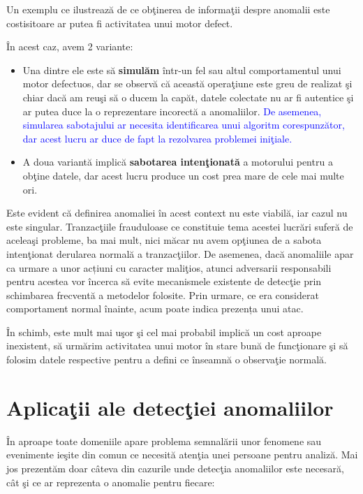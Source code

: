Un exemplu ce ilustrează de ce obţinerea de informaţii
despre anomalii este costisitoare ar putea fi activitatea unui
motor defect.

În acest caz, avem 2 variante:
\begin{itemize}
    \item Una dintre ele 
        este să \textbf{simulăm} 
        într-un fel sau altul comportamentul unui motor defectuos, dar 
        se observă că această operaţiune este greu de realizat şi chiar dacă am reuşi 
        să o ducem la capăt, datele colectate nu ar fi autentice şi ar putea duce 
        la o reprezentare incorectă a anomaliilor. \textcolor{blue}{
        De asemenea, simularea
        sabotajului ar necesita identificarea unui algoritm corespunzător, 
        dar acest lucru ar duce de fapt la rezolvarea problemei iniţiale.}

    \item A doua variantă implică \textbf{sabotarea 
        intenţionată} a motorului pentru a obţine datele, dar acest lucru produce un 
        cost prea mare de cele mai multe ori. 
\end{itemize}

Este evident că definirea anomaliei în acest context nu este viabilă, iar 
cazul nu este singular. Tranzacţiile frauduloase ce constituie tema acestei lucrări 
suferă de aceleaşi probleme, ba mai mult, nici măcar nu avem opţiunea de a 
sabota intenţionat derularea normală a tranzacţiilor. De asemenea,
dacă anomaliile apar ca urmare a unor acțiuni cu caracter maliţios,
atunci adversarii responsabili pentru acestea vor încerca să 
evite mecanismele existente de detecţie prin schimbarea 
frecventă a metodelor folosite. Prin urmare, ce era considerat
comportament normal înainte, acum poate indica prezența unui 
atac.


În schimb, 
este mult mai uşor şi cel mai probabil 
implică un cost aproape inexistent, să urmărim activitatea unui motor 
în stare bună de funcţionare şi să folosim datele respective pentru a 
defini ce înseamnă o observaţie normală.

\section{Aplicaţii ale detecţiei anomaliilor}

În aproape toate domeniile apare problema semnalării unor fenomene sau evenimente 
ieşite din comun ce necesită atenţia unei persoane pentru analiză. Mai jos prezentăm
doar câteva din cazurile unde detecţia anomaliilor este necesară, cât şi ce ar 
reprezenta o anomalie pentru fiecare:

